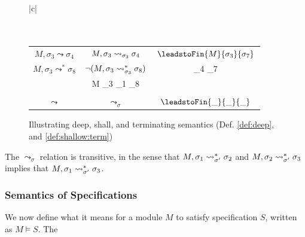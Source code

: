 \begin{figure}[htb]
\begin{tabular}{|c|}
\hline \\
\\
\hline
\\
\begin{tabular}{c|c|c}
$M, {\sigma_3} \leadsto  \sigma_4 $ & 
  $M, \sigma_3 \leadsto_{\sigma_3} \sigma_4 $ & 
  $\leadstoFin {M} {\sigma_3} {\sigma_7}$
\\
 $M, {\sigma_3} \leadsto^*  \sigma_8 $ & 
$\neg(M, \sigma_3 \leadsto^*_{\sigma_3} \sigma_8)$ 
&
\leadstoFin {M} {\sigma_4} {\sigma_7} \\
&
 \leadstoRecStar M {\sigma_3} {\sigma_1}   {\sigma_8}
  &
   \\
 \hline
 \\
 $\leadsto$
 &
 $\leadsto_{\sigma}$
 &
  $\leadstoFin {\_} {\_} {\_}$
\\
\hline
\end{tabular}
\end{tabular}
   \caption{Illustrating  %
   deep, shall, and terminating semantics
     (Def. \ref{def:deep}, and \ref{def:shallow:term})%
    }
   \label{fig:UpSemantics}
 \end{figure}

 
{ The $\leadsto_{\sigma}$ relation is transitive, in the sense that $M, \sigma_1 \leadsto^*_{\sigma'} \sigma_2$ and $M, \sigma_2 \leadsto^*_{\sigma'} \sigma_3$ implies that $M, \sigma_1 \leadsto^*_{\sigma'} \sigma_3$.}
 
 




 




\subsubsection{ Semantics of \SpecLang Specifications}
We now  define what it means for  a module  $M$ to satisfy specification  $S$, written as $M \vDash S$. The
 
